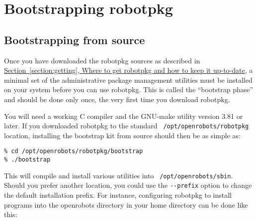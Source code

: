 %
%
%
%
%

\section{Bootstrapping robotpkg} %

\subsection{Bootstrapping from source} %

Once  you   have    downloaded   the   robotpkg  sources   as    described   in
\hyperref[section:getting]{Section~\ref*{section:getting},   Where   to     get
robotpkg and how  to keep it up-to-date},  a minimal set  of the administrative
package  management utilities must be installed  on  your system before you can
use robotpkg.  This is called  the ``bootstrap phase'' and  should be done only
once, the very first time you download robotpkg.

You will  need a working C  compiler and the GNU-make   utility version 3.81 or
later.     If   you     downloaded      robotpkg  to     the    standard   {\tt
/opt/openrobots/robotpkg}  location, installing  the  bootstrap kit from source
should then be as simple as:

\begin{verbatim}
% cd /opt/openrobots/robotpkg/bootstrap
% ./bootstrap
\end{verbatim}

This     will    compile  and     install   various     utilities    into  {\tt
/opt/openrobots/sbin}.  Should you prefer  another location, you could  use the
{\tt -{}-prefix}   option to  change   the default  installation   prefix.  For
instance,  configuring  robotpkg  to   install  programs  into  the  openrobots
directory in your home directory can be done like this:


